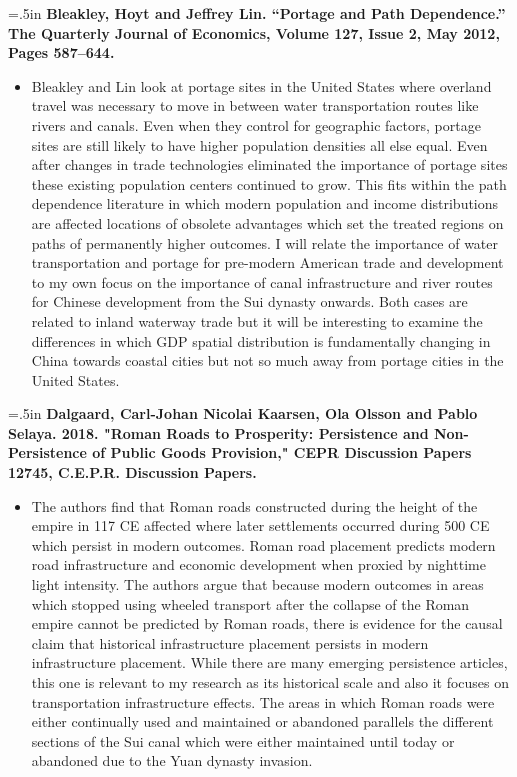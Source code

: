 \documentclass[11pt]{article}
\begin{document}
\hangindent=.5in
\textbf{Bleakley, Hoyt and Jeffrey Lin. “Portage and Path Dependence.” The Quarterly Journal of Economics, Volume 127, Issue 2, May 2012, Pages 587–644.}
\begin{itemize}
    \item [~]
    Bleakley and Lin look at portage sites in the United States where overland travel was necessary to move in between water transportation routes like rivers and canals. Even when they control for geographic factors, portage sites are still likely to have higher population densities all else equal. Even after changes in trade technologies eliminated the importance of portage sites these existing population centers continued to grow. This fits within the path dependence literature in which modern population and income distributions are affected locations of obsolete advantages which set the treated regions on paths of permanently higher outcomes. I will relate the importance of water transportation and portage for pre-modern American trade and development to my own focus on the importance of canal infrastructure and river routes for Chinese development from the Sui dynasty onwards. Both cases are related to inland waterway trade but it will be interesting to examine the differences in which GDP spatial distribution is fundamentally changing in China towards coastal cities but not so much away from portage cities in the United States. 

\end{itemize}

\hangindent=.5in
\textbf{Dalgaard, Carl-Johan Nicolai Kaarsen, Ola Olsson and Pablo Selaya. 2018. "Roman Roads to Prosperity: Persistence and Non-Persistence of Public Goods Provision," CEPR Discussion Papers 12745, C.E.P.R. Discussion Papers.}
\begin{itemize}
    \item [~]
    The authors find that Roman roads constructed during the height of the empire in 117 CE affected where later settlements occurred during 500 CE which persist in modern outcomes. Roman road placement predicts modern road infrastructure and economic development when proxied by nighttime light intensity. The authors argue that because modern outcomes in areas which stopped using wheeled transport after the collapse of the Roman empire cannot be predicted by Roman roads, there is evidence for the causal claim that historical infrastructure placement persists in modern infrastructure placement. While there are many emerging persistence articles, this one is relevant to my research as its historical scale and also it focuses on transportation infrastructure effects. The areas in which Roman roads were either continually used and maintained or abandoned parallels the different sections of the Sui canal which were either maintained until today or abandoned due to the Yuan dynasty invasion.
\end{itemize}
\end{document}
